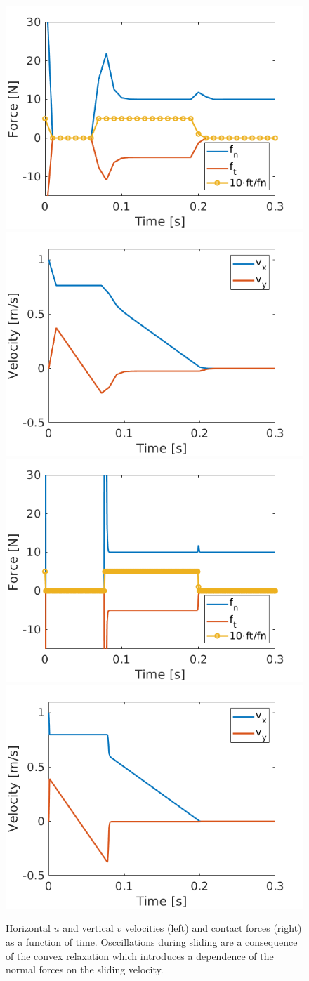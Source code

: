 \begin{figure}[!h]
	\centering
	\includegraphics[width=0.45\columnwidth]{figures/sliding_box/forces_h1em2.png}
    \includegraphics[width=0.45\columnwidth]{figures/sliding_box/velocities_h1em2.png}\\
    \includegraphics[width=0.45\columnwidth]{figures/sliding_box/forces_h1em3.png}
    \includegraphics[width=0.45\columnwidth]{figures/sliding_box/velocities_h1em3.png}\\
	\caption{\label{fig:sliding_box} 
	Horizontal $u$ and vertical $v$ velocities (left) and contact forces (right)
	as a function of time. Osccillations during sliding are a consequence of the
	convex relaxation which introduces a dependence of the normal forces on the
	sliding velocity.}
\end{figure}

